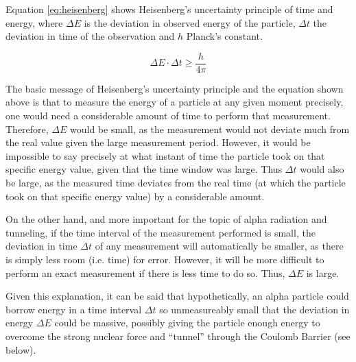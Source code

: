 Equation \ref{eq:heisenberg} shows Heisenberg's uncertainty principle of time and energy, where $\Delta E$ is the deviation in observed energy of the particle, $\Delta t$ the deviation in time of the observation and $h$ Planck's constant. 

\begin{equation}
  \Delta E \cdot \Delta t \geq \frac{h}{4\pi}
  \label{eq:heisenberg}
\end{equation}

The basic message of Heisenberg's uncertainty principle and the equation shown above is that to measure the energy of a particle at any given moment precisely, one would need a considerable amount of time to perform that measurement. Therefore, $\Delta E$ would be small, as the measurement would not deviate much from the real value given the large measurement period. However, it would be impossible to say precisely at what instant of time the particle took on that specific energy value, given that the time window was large. Thus $\Delta t$ would also be large, as the measured time deviates from the real time (at which the particle took on that specific energy value) by a considerable amount.

On the other hand, and more important for the topic of alpha radiation and tunneling, if the time interval of the measurement performed is small, the deviation in time $\Delta t$ of any measurement will automatically be smaller, as there is simply less room (i.e. time) for error. However, it will be more difficult to perform an exact measurement if there is less time to do so. Thus, $\Delta E$ is large. 

Given this explanation, it can be said that hypothetically, an alpha particle could borrow energy in a time interval $\Delta t$ so unmeasureably small that the deviation in energy $\Delta E$ could be massive, possibly giving the particle enough energy to overcome the strong nuclear force and ``tunnel'' through the Coulomb Barrier (see below).


